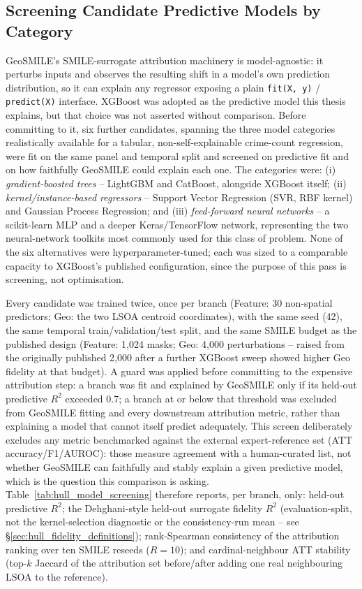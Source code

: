 \subsection{Screening Candidate Predictive Models by Category}
\label{sec:hull_model_screening}

GeoSMILE's SMILE-surrogate attribution machinery is model-agnostic: it perturbs
inputs and observes the resulting shift in a model's own prediction
distribution, so it can explain any regressor exposing a plain
\texttt{fit(X, y)} / \texttt{predict(X)} interface. XGBoost was adopted as the
predictive model this thesis explains, but that choice was not asserted
without comparison. Before committing to it, six further candidates, spanning
the three model categories realistically available for a tabular,
non-self-explainable crime-count regression, were fit on the same panel and
temporal split and screened on predictive fit and on how faithfully GeoSMILE
could explain each one. The categories were: (i) \emph{gradient-boosted
trees} -- LightGBM and CatBoost, alongside XGBoost itself; (ii)
\emph{kernel/instance-based regressors} -- Support Vector Regression (SVR,
RBF kernel) and Gaussian Process Regression; and (iii) \emph{feed-forward
neural networks} -- a scikit-learn MLP and a deeper Keras/TensorFlow network,
representing the two neural-network toolkits most commonly used for this
class of problem. None of the six alternatives were hyperparameter-tuned;
each was sized to a comparable capacity to XGBoost's published configuration,
since the purpose of this pass is screening, not optimisation.

Every candidate was trained twice, once per branch (Feature: 30 non-spatial
predictors; Geo: the two LSOA centroid coordinates), with the same seed (42),
the same temporal train/validation/test split, and the same SMILE budget as
the published design (Feature: 1{,}024 masks; Geo: 4{,}000 perturbations --
raised from the originally published 2{,}000 after a further XGBoost sweep
showed higher Geo fidelity at that budget). A guard was applied before
committing to the expensive attribution step: a branch was fit and explained
by GeoSMILE only if its held-out predictive $R^2$ exceeded 0.7; a branch at or
below that threshold was excluded from GeoSMILE fitting and every downstream
attribution metric, rather than explaining a model that cannot itself
predict adequately. This screen deliberately excludes any metric benchmarked
against the external expert-reference set (ATT accuracy/F1/AUROC): those
measure agreement with a human-curated list, not whether GeoSMILE can
faithfully and stably explain a given predictive model, which is the
question this comparison is asking. Table~\ref{tab:hull_model_screening}
therefore reports, per branch, only: held-out predictive $R^2$; the
Dehghani-style held-out surrogate fidelity $R^2$ (evaluation-split, not the
kernel-selection diagnostic or the consistency-run mean -- see
\S\ref{sec:hull_fidelity_definitions}); rank-Spearman consistency of the
attribution ranking over ten SMILE reseeds ($R=10$); and cardinal-neighbour
ATT stability (top-$k$ Jaccard of the attribution set before/after adding one
real neighbouring LSOA to the reference).

